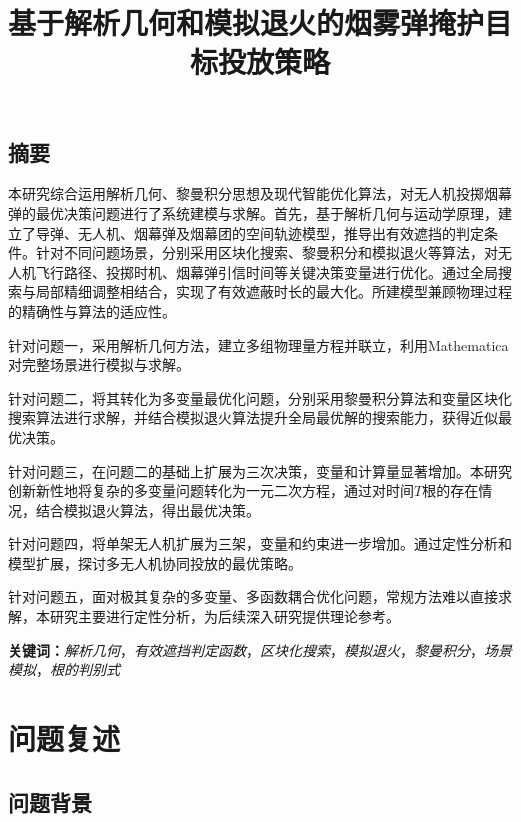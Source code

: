 \documentclass{article}
\title{{\fontsize{18pt}{\baselineskip}\selectfont 基于解析几何和模拟退火的烟雾弹掩护目标投放策略}}
\date{}
\begin{document}
\maketitle
\begin{center}
\section*{摘要}
\end{center}
\vspace{-1em}


\noindent

本研究综合运用解析几何、黎曼积分思想及现代智能优化算法，对无人机投掷烟幕弹的最优决策问题进行了系统建模与求解。首先，基于解析几何与运动学原理，建立了导弹、无人机、烟幕弹及烟幕团的空间轨迹模型，推导出有效遮挡的判定条件。针对不同问题场景，分别采用区块化搜索、黎曼积分和模拟退火等算法，对无人机飞行路径、投掷时机、烟幕弹引信时间等关键决策变量进行优化。通过全局搜索与局部精细调整相结合，实现了有效遮蔽时长的最大化。所建模型兼顾物理过程的精确性与算法的适应性。

针对问题一，采用解析几何方法，建立多组物理量方程并联立，利用Mathematica对完整场景进行模拟与求解。

针对问题二，将其转化为多变量最优化问题，分别采用黎曼积分算法和变量区块化搜索算法进行求解，并结合模拟退火算法提升全局最优解的搜索能力，获得近似最优决策。

针对问题三，在问题二的基础上扩展为三次决策，变量和计算量显著增加。本研究创新新性地将复杂的多变量问题转化为一元二次方程，通过对时间$T$根的存在情况，结合模拟退火算法，得出最优决策。

针对问题四，将单架无人机扩展为三架，变量和约束进一步增加。通过定性分析和模型扩展，探讨多无人机协同投放的最优策略。

针对问题五，面对极其复杂的多变量、多函数耦合优化问题，常规方法难以直接求解，本研究主要进行定性分析，为后续深入研究提供理论参考。
\noindent

\textbf{关键词：}\textit{解析几何}，\textit{有效遮挡判定函数}，\textit{区块化搜索}，\textit{模拟退火}，\textit{黎曼积分}，\textit{场景模拟}，\textit{根的判别式}



\section{问题复述}

\subsection{问题背景}
\end{document}
